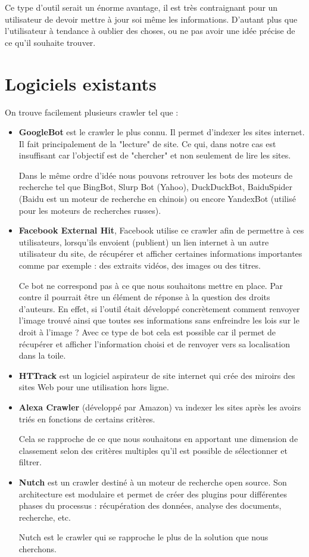 \documentclass[a4paper,12pt]{article}
\begin{document}
Ce type d'outil serait un énorme avantage, il est très contraignant pour un utilisateur de devoir mettre à jour soi même les informations. D'autant plus que l'utilisateur à tendance à oublier des choses, ou ne pas avoir une idée précise de ce qu'il souhaite trouver. 

\section{Logiciels existants}
On trouve facilement plusieurs crawler tel que : 
\begin{itemize}
\item \textbf{GoogleBot} 
 est le crawler le plus connu. Il permet d'indexer les sites internet. Il fait principalement de la "lecture" de site. Ce qui, dans notre cas est insuffisant car l'objectif est de "chercher" et non seulement de lire les sites. 

Dans le même ordre d'idée nous pouvons retrouver les bots des moteurs de recherche tel que BingBot, Slurp Bot (Yahoo), DuckDuckBot, BaiduSpider (Baidu est un moteur de recherche en chinois) ou encore YandexBot (utilisé pour les moteurs de recherches russes).
\item \textbf{Facebook External Hit},
Facebook utilise ce crawler afin de permettre à ces utilisateurs, lorsqu'ils envoient (publient) un lien internet à un autre utilisateur du site, de récupérer et afficher certaines informations importantes comme par exemple : des extraits vidéos, des images ou des titres. 

Ce bot ne correspond pas à ce que nous souhaitons mettre en place. Par contre il pourrait être un élément de réponse à la question des droits d'auteurs. En effet, si l'outil était développé concrètement comment renvoyer l'image trouvé ainsi que toutes ses informations sans enfreindre les lois sur le droit à l'image ? Avec ce type de bot cela est possible car il permet de récupérer et afficher l'information choisi et de renvoyer vers sa localisation dans la toile. 
\item \textbf{HTTrack}
 est un logiciel aspirateur de site internet qui crée des miroirs des sites Web pour une utilisation hors ligne.
\item \textbf{Alexa Crawler}
 (développé par Amazon) va indexer les sites après les avoirs triés en fonctions de certains critères. 

Cela se rapproche de ce que nous souhaitons en apportant une dimension de classement selon des critères multiples qu'il est possible de sélectionner et filtrer. 
\item \textbf{Nutch}
 est un crawler destiné à un moteur de recherche open source. Son architecture est modulaire et permet de créer des plugins pour différentes phases du processus : récupération des données, analyse des documents, recherche, etc.

Nutch est le crawler qui se rapproche le plus de la solution que nous cherchons. 
\end{itemize}
\end{document}

